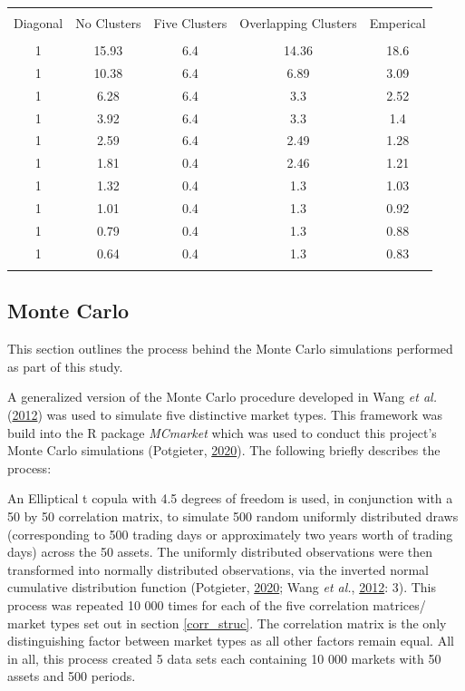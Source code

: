 \documentclass[11pt,preprint, authoryear]{elsarticle}
\let\origtable\table
\let\endorigtable\endtable
\renewenvironment{table}[1][2] {
    \expandafter\origtable\expandafter[H]
} {
    \endorigtable
}
\numberwithin{equation}{section}
\numberwithin{figure}{section}
\numberwithin{table}{section}
\begin{document}
\begin{table}[!htbp] \centering 
  \caption{Eigenvalues} 
  \label{eigens} 
\begin{tabular}{@{\extracolsep{5pt}} ccccc} 
\\[-1.8ex]\hline 
\hline \\[-1.8ex] 
Diagonal & No Clusters & Five Clusters & Overlapping Clusters & Emperical \\ 
\hline \\[-1.8ex] 
1 & 15.93 & 6.4 & 14.36 & 18.6 \\ 
1 & 10.38 & 6.4 & 6.89 & 3.09 \\ 
1 & 6.28 & 6.4 & 3.3 & 2.52 \\ 
1 & 3.92 & 6.4 & 3.3 & 1.4 \\ 
1 & 2.59 & 6.4 & 2.49 & 1.28 \\ 
1 & 1.81 & 0.4 & 2.46 & 1.21 \\ 
1 & 1.32 & 0.4 & 1.3 & 1.03 \\ 
1 & 1.01 & 0.4 & 1.3 & 0.92 \\ 
1 & 0.79 & 0.4 & 1.3 & 0.88 \\ 
1 & 0.64 & 0.4 & 1.3 & 0.83 \\ 
\hline \\[-1.8ex] 
\end{tabular} 
\end{table}

\hypertarget{monte-carlo}{%
\subsection{\texorpdfstring{Monte Carlo
\label{mc}}{Monte Carlo }}\label{monte-carlo}}

This section outlines the process behind the Monte Carlo simulations
performed as part of this study.

A generalized version of the Monte Carlo procedure developed in Wang
\emph{et al.} (\protect\hyperlink{ref-wang2012}{2012}) was used to
simulate five distinctive market types. This framework was build into
the R package \emph{MCmarket} which was used to conduct this project's
Monte Carlo simulations (Potgieter,
\protect\hyperlink{ref-MCmarket}{2020}). The following briefly describes
the process:

An Elliptical t copula with 4.5 degrees of freedom is used, in
conjunction with a 50 by 50 correlation matrix, to simulate 500 random
uniformly distributed draws (corresponding to 500 trading days or
approximately two years worth of trading days) across the 50 assets. The
uniformly distributed observations were then transformed into normally
distributed observations, via the inverted normal cumulative
distribution function (Potgieter,
\protect\hyperlink{ref-MCmarket}{2020}; Wang \emph{et al.},
\protect\hyperlink{ref-wang2012}{2012}: 3). This process was repeated 10
000 times for each of the five correlation matrices/ market types set
out in section \ref{corr_struc}. The correlation matrix is the only
distinguishing factor between market types as all other factors remain
equal. All in all, this process created 5 data sets each containing 10
000 markets with 50 assets and 500 periods.
\end{document}
